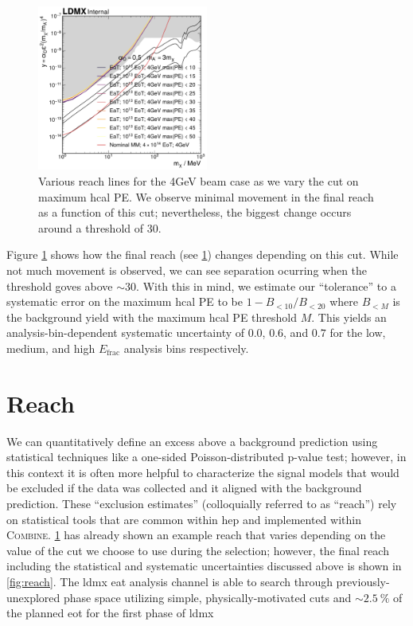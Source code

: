 \begin{figure}
  \centering
  \includegraphics[width=0.5\textwidth]{figures/ldmx/analysis/systematics/max-pe-scan-4gev.pdf}
  \caption{Various reach lines for the 4GeV beam case as we vary the cut on
  maximum \ac{hcal} PE. We observe minimal movement in the final reach as a function
  of this cut; nevertheless, the biggest change occurs around a threshold of 30.}
  \label{fig:4gev-max-pe-scan}
\end{figure}

Figure \ref{fig:4gev-max-pe-scan} shows how the final reach (see \cref{sec:ldmx:analysis:reach})
changes depending on this cut.
While not much movement is observed, we can see separation ocurring when the threshold
goves above $\sim 30$.
With this in mind, we estimate our ``tolerance'' to a systematic error on the maximum
\ac{hcal} PE to be $1 - B_{< 10}/B_{< 20}$ where $B_{< M}$ is the background yield
with the maximum \ac{hcal} PE threshold $M$.
This yields an analysis-bin-dependent systematic uncertainty of $0.0$, $0.6$, and $0.7$
for the low, medium, and high $E_\text{frac}$ analysis bins respectively.

\section{Reach}
\label{sec:ldmx:analysis:reach}
We can quantitatively define an excess above a background prediction using statistical techniques
like a one-sided Poisson-distributed p-value test; however, in this context it is often more helpful
to characterize the signal models that would be excluded if the data was collected and it aligned
with the background prediction.
These ``exclusion estimates'' (colloquially referred to as ``reach'') rely on statistical tools
that are common within \ac{hep} and implemented within \textsc{Combine}\cite{cms-combine}.
\cref{fig:4gev-max-pe-scan} has already shown an example reach that varies depending on the value
of the cut we choose to use during the selection; however, the final reach including the statistical
and systematic uncertainties discussed above is shown in \cref{fig:reach}.
The \ac{ldmx} \ac{eat} analysis channel is able to search through previously-unexplored phase space
utilizing simple, physically-motivated cuts and $\sim \qty{2.5}{\percent}$ of the planned \ac{eot}
for the first phase of \ac{ldmx}

